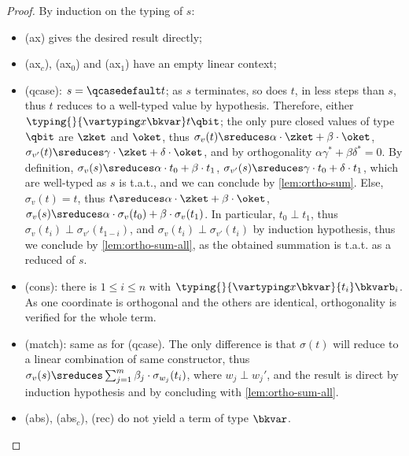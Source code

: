 \begin{proof}
  By induction on the typing of $s$:
  \begin{itemize}
    \item (ax) gives the desired result directly;

    \item (ax$_c$), (ax$_0$) and (ax$_1$) have an empty linear context;

    \item (qcase): $s = \qcasedefault t$; as $s$ terminates,
      so does $t$, in less steps than $s$, thus $t$ reduces to a well-typed
      value by hypothesis. Therefore,
      either $\typing {} {\vartyping x \bkvar} t \qbit$;
      the only pure closed values of type $\qbit$ are $\zket$ and $\oket$, thus
      $\sigma_v(t) \sreduces \alpha \cdot \zket + \beta \cdot \oket$,
      $\sigma_{v'}(t) \sreduces \gamma \cdot \zket + \delta \cdot \oket$,
      and by orthogonality $\alpha\gamma^* + \beta\delta^*  = 0$.
      By definition, $\sigma_v(s) \sreduces \alpha \cdot t_0 + \beta \cdot t_1$,
      $\sigma_{v'}(s) \sreduces \gamma \cdot t_0 + \delta \cdot t_1$,
      which are well-typed as $s$ is t.a.t.,
      and we can conclude by \autoref{lem:ortho-sum}.
      Else, $\sigma_v(t) = t$, thus $t \sreduces \alpha \cdot \zket +
      \beta \cdot \oket$,
      $\sigma_v(s) \sreduces \alpha \cdot \sigma_v(t_0) + \beta \cdot
      \sigma_v(t_1)$.
      In particular, $t_0 \perp t_1$, thus $\sigma_v(t_i) \perp
      \sigma_{v'}(t_{1-i})$,
      and $\sigma_v(t_i) \perp \sigma_{v'}(t_i)$ by induction
      hypothesis, thus we conclude by \autoref{lem:ortho-sum-all},
      as the obtained summation is t.a.t. as a reduced of $s$.

    \item (cons): there is $1 \leq i \leq n$ with $\typing {}
      {\vartyping x \bkvar} {t_i} \bkvarb_i$.
      As one coordinate is orthogonal and the others are identical,
      orthogonality is verified for the whole term.

    \item (match): same as for (qcase). The only difference is that
      $\sigma(t)$ will reduce to a linear combination of same
      constructor, thus $\sigma_v(s) \sreduces \sum_{j=1}^m \beta_j
      \cdot \sigma_{w_j}(t_i)$,
      where $w_j \perp w_j'$, and the result is direct by induction hypothesis
      and by concluding with \autoref{lem:ortho-sum-all}.

    \item (abs), (abs$_c$), (rec) do not yield a term of type $\bkvar$.


\end{itemize}
\end{proof}
